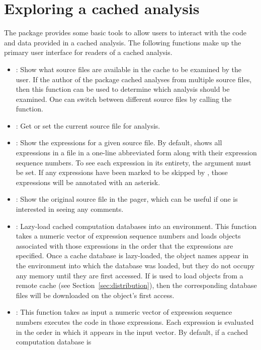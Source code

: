 \documentclass[nojss]{jss}
\begin{document}
\section{Exploring a cached analysis}
\label{sec:exploring}


The  package provides some basic tools to allow users to
interact with the code and data provided in a cached analysis.  The
following functions make up the primary user interface for readers of
a cached analysis.
\begin{itemize}
\item
{}: Show what source files are available in the cache to
be examined by the user.  If the author of the package cached analyses
from multiple source files, then this function can be used to
determine which analysis should be examined.  One can switch between
different source files by calling the  function.
\item
{}: Get or set the current source file for analysis.
\item
{}: Show the expressions for a given source file.  By
default,  shows all expressions in a file in a one-line
abbreviated form along with their expression sequence numbers.  To see
each expression in its entirety, the argument  must
be set.  If any expressions have been marked to be skipped by
, those expressions will be annotated with an asterisk.
\item
{}: Show the original source file in the pager, which can
be useful if one is interested in seeing any comments.
\item
{}: Lazy-load cached computation databases into an
environment.  This function takes a numeric vector of expression
sequence numbers and loads objects associated with those expressions
in the order that the expressions are specified.  Once a cache
database is lazy-loaded, the object names appear in the environment
into which the database was loaded, but they do not occupy any memory
until they are first accessed.  If  is used to load
objects from a remote cache (see Section~\ref{sec:distribution}), then
the corresponding database files will be downloaded on the object's
first access.
\item
{}: This function takes as input a numeric vector of
expression sequence numbers executes the code in those expressions.
Each expression is evaluated in the order in which it appears in the
input vector.  By default, if a cached computation database is

\end{itemize}
\end{document}

